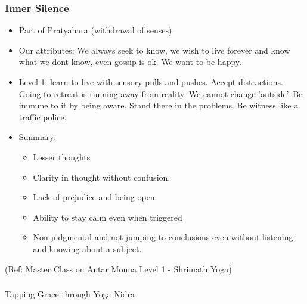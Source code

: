 \begin{frame}[fragile]\frametitle{Inner Silence}


		\begin{itemize}
		\item Part of Pratyahara (withdrawal of senses).
		\item Our attributes: We always seek to know, we wish to live forever and know what we dont know, even gossip is ok. We want to be happy.
		\item Level 1: learn to live with sensory pulls and pushes. Accept distractions. Going to retreat is running away from reality. We cannot change 'outside'. Be immune to it by being aware. Stand there in the problems. Be witness like a traffic police.
		\item Summary:
			\begin{itemize}
			\item Lesser thoughts
			\item Clarity in thought without confusion.
			\item Lack of prejudice and being open.
			\item Ability to stay calm even when triggered 
			\item Non judgmental and not jumping to conclusions even without listening and knowing about a subject.
			\end{itemize}
		\end{itemize}

{\tiny (Ref:  Master Class on Antar Mouna Level 1 - Shrimath Yoga)}

\end{frame}


\begin{frame}[fragile]\frametitle{}
\begin{center}
{\Large Tapping Grace through Yoga Nidra}
\end{center}
\end{frame}

